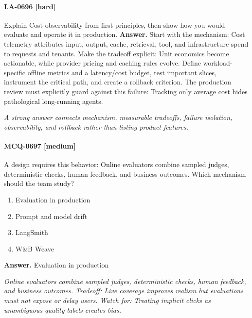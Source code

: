 \paragraph{LA-0696 [hard]} Explain Cost observability from first principles, then show how you would evaluate and operate it in production.
\noindent\textbf{Answer.} Start with the mechanism: Cost telemetry attributes input, output, cache, retrieval, tool, and infrastructure spend to requests and tenants. Make the tradeoff explicit: Unit economics become actionable, while provider pricing and caching rules evolve. Define workload-specific offline metrics and a latency/cost budget, test important slices, instrument the critical path, and create a rollback criterion. The production review must explicitly guard against this failure: Tracking only average cost hides pathological long-running agents.
\par\textit{A strong answer connects mechanism, measurable tradeoffs, failure isolation, observability, and rollback rather than listing product features.}
\paragraph{MCQ-0697 [medium]} A design requires this behavior: Online evaluators combine sampled judges, deterministic checks, human feedback, and business outcomes. Which mechanism should the team study?
\begin{enumerate}[label=\Alph*.]
\item Evaluation in production
\item Prompt and model drift
\item LangSmith
\item W\&B Weave
\end{enumerate}
\noindent\textbf{Answer.} Evaluation in production
\par\textit{Online evaluators combine sampled judges, deterministic checks, human feedback, and business outcomes. Tradeoff: Live coverage improves realism but evaluations must not expose or delay users. Watch for: Treating implicit clicks as unambiguous quality labels creates bias.}
